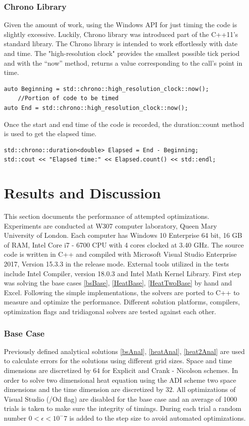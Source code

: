 \documentclass[12pt, oneside]{book}
\theoremstyle{plain}
\theoremstyle{definition}
\begin{document}
\subsection{Chrono Library}
Given the amount of work, using the Windows API for just timing the code is slightly excessive. Luckily, Chrono library was introduced part of the C++11’s standard library. The Chrono library is intended to work effortlessly with date and time. The "high-resolution clock" provides the smallest possible tick period and with the “now” method, returns a value corresponding to the call’s point in time. 
\begin{verbatim}
auto Beginning = std::chrono::high_resolution_clock::now();
    //Portion of code to be timed
auto End = std::chrono::high_resolution_clock::now();
\end{verbatim}
Once the start and end time of the code is recorded, the duration::count method is used to get the elapsed time.
\begin{verbatim}
std::chrono::duration<double> Elapsed = End - Beginning;
std::cout << "Elapsed time:" << Elapsed.count() << std::endl;
\end{verbatim}


\chapter{Results and Discussion}
This section documents the performance of attempted optimizations. Experiments are conducted at W307 computer laboratory, Queen Mary University of London. Each computer has Windows 10 Enterprise 64 bit, 16 GB of RAM, Intel Core i7 - 6700 CPU with 4 cores clocked at 3.40 GHz. The source code is written in C++ and compiled with Microsoft Visual Studio Enterprise 2017, Version 15.3.3 in the release mode. External tools utilized in the tests include Intel Compiler, version 18.0.3 and Intel Math Kernel Library. First step was solving the base cases \ref{bsBase}, \ref{HeatBase}, \ref{HeatTwoBase} by hand and Excel. Following the simple implementations, the solvers are ported to C++ to measure and optimize the performance. Different solution platforms, compilers, optimization flags and tridiagonal solvers are tested against each other.
 
\subsection{Base Case}
Previously defined analytical solutions \ref{bsAnal}, \ref{heatAnal}, \ref{heat2Anal} are used to calculate errors for the solutions using different grid sizes. Space and time dimensions are discretized by $64$ for Explicit and Crank - Nicolson schemes. In order to solve two dimensional heat equation using the ADI scheme two space dimensions and the time dimension are discretized by $32$.  All optimizations of Visual Studio  (/Od flag) are disabled for the base case and an average of 1000 trials is taken to make sure the integrity of timings. During each trial a random number $ 0 < \epsilon < 10^-7 $ is added to the step size to avoid automated optimizations.
\end{document}
